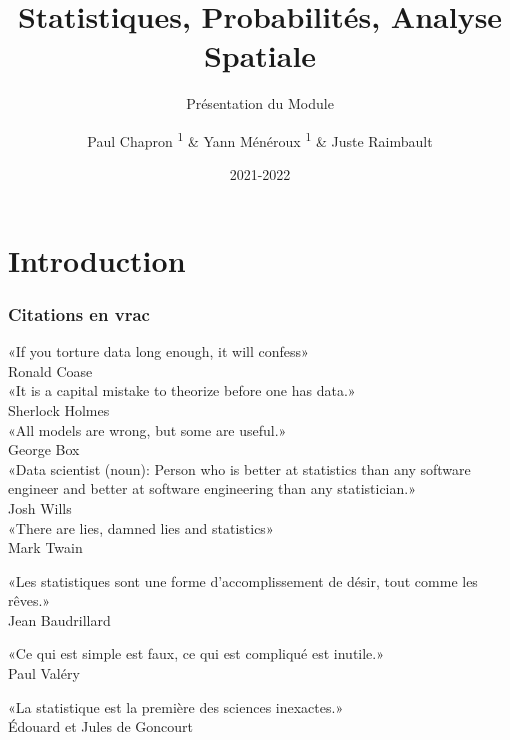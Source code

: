 \documentclass{beamer}
\title{Statistiques, Probabilités, Analyse Spatiale}
\subtitle{Présentation du Module}
\date{2021-2022}
\author{Paul Chapron \textsuperscript{1} \& Yann Ménéroux \textsuperscript{1} \& Juste Raimbault }
\institute{ \textsuperscript{1}IGN-ENSG-UGE}
\begin{document}
\maketitle	

\section{Introduction} 



\begin{frame}
\frametitle{Citations en vrac}

\begin{tiny}


\hfill «If you torture data long enough, it will confess» \\
\hfill Ronald Coase\\
\vfill
\hfill «It is a capital mistake to theorize before one has data.»\\
\hfill Sherlock Holmes\\
\vfill
\hfill «All models are wrong, but some are useful.»\\
\hfill  George Box\\
\vfill
\hfill «Data scientist (noun): Person who is better at statistics than any software engineer and better at software engineering than any statistician.»\\
\hfill Josh Wills\\
\vfill
\hfill «There are lies, damned lies and statistics» \\
\hfill Mark Twain\\ 
\vfill

\hfill «Les statistiques sont une forme d'accomplissement de désir, tout comme les rêves.» \\
\hfill Jean Baudrillard\\
\vfill



\hfill «Ce qui est simple est faux, ce qui est compliqué est inutile.» \\
\hfill Paul Valéry\\
\vfill


\hfill «La statistique est la première des sciences inexactes.»\\
\hfill  Édouard et Jules de Goncourt



\end{tiny}


\end{frame}
\end{document}
